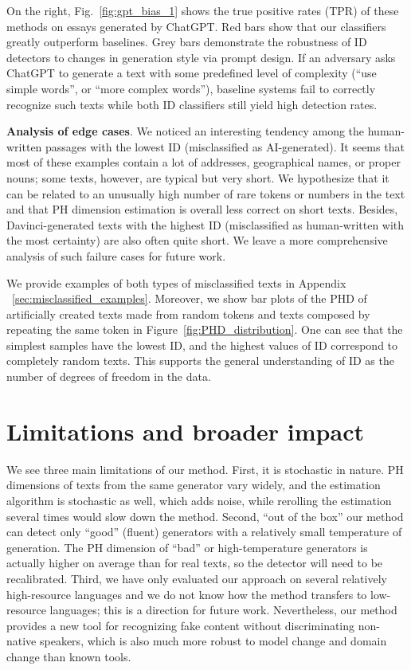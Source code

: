 \documentclass{article}
\begin{document}
On the right, Fig.~\ref{fig:gpt_bias_1} shows the true positive rates (TPR) of these methods on essays generated by ChatGPT. Red bars show that our classifiers greatly outperform baselines. Grey bars demonstrate the robustness of ID detectors to changes in generation style via prompt design. If an adversary asks ChatGPT to generate a text with some predefined level of complexity (``use simple words'', or ``more complex words''), baseline systems fail to correctly recognize such texts while both ID classifiers still yield high detection rates.   

\textbf{Analysis of edge cases}. %
We noticed an interesting tendency among the human-written passages with the lowest ID (misclassified as AI-generated). It seems that most of these examples contain a lot of addresses, geographical names, or proper nouns; some texts, however, are typical but very short. %
We hypothesize that it can be related to an unusually high number of rare tokens or numbers in the text and that PH dimension estimation is overall less correct on short texts. Besides, Davinci-generated texts with the highest ID (misclassified as human-written with the most certainty) are also often quite short. We leave a more comprehensive analysis of such failure cases for future work.

We provide examples of both types of misclassified texts in Appendix ~\ref{sec:misclassified_examples}. Moreover, we show bar plots of the PHD of artificially created texts made from random tokens and texts composed by repeating the same token in Figure~\ref{fig:PHD_distribution}. One can see that the simplest samples have the lowest ID, and the highest values of ID correspond to completely random texts. This supports the general understanding of ID as the number of degrees of freedom in the data.








\section{Limitations and broader impact}\label{sec:limits}

We see three main limitations of our method. First,
    it is stochastic in nature. PH dimensions of texts from the same generator vary widely, and the estimation algorithm is stochastic as well, which adds noise, while rerolling the estimation several times would slow down the method.
    Second, ``out of the box'' our method can detect only ``good'' (fluent) generators with a relatively small temperature of generation. The PH dimension of ``bad'' or high-temperature generators is actually higher on average than for real texts, so the detector will need to be recalibrated.
    Third, we have only evaluated our approach on several relatively high-resource languages and we do not know how the method transfers to low-resource languages; this is a direction for future work.
Nevertheless, our method provides a new tool for recognizing fake content without discriminating non-native speakers, which is also much more robust to model change and domain change than known tools. 
\end{document}

